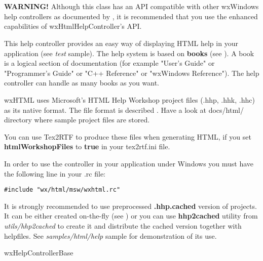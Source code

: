 %
%

\section{}\label{wxhtmlhelpcontroller}

{\bf WARNING!} Although this class has an API compatible with other wxWindows
help controllers as documented by , it
is recommended that you use the enhanced capabilities of wxHtmlHelpController's API.

This help controller provides an easy way of displaying HTML help in your
application (see {\it test} sample). The help system is based on {\bf books} 
(see ). A book is a logical
section of documentation (for example "User's Guide" or "Programmer's Guide" or
"C++ Reference" or "wxWindows Reference"). The help controller can handle as
many books as you want.

wxHTML uses Microsoft's HTML Help Workshop project files (.hhp, .hhk, .hhc) as its
native format. The file format is described .
Have a look at docs/html/ directory where sample project files are stored.

You can use Tex2RTF to produce these files when generating HTML, if you set {\bf htmlWorkshopFiles} to {\bf true} in
your tex2rtf.ini file.

In order to use the controller in your application under Windows you must
have the following line in your .rc file:

\begin{verbatim}
#include "wx/html/msw/wxhtml.rc"
\end{verbatim}


It is strongly recommended to use preprocessed {\bf .hhp.cached} version of
projects. It can be either created on-the-fly (see 
) or you can use 
{\bf hhp2cached} utility from {\it utils/hhp2cached} to create it and
distribute the cached version together with helpfiles. See {\it samples/html/help} 
sample for demonstration of its use.


wxHelpControllerBase


